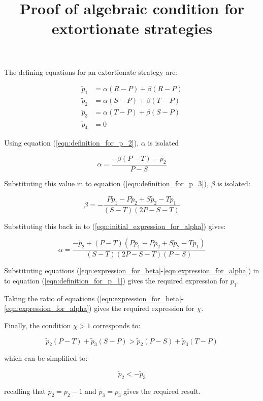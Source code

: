 \documentclass[a4]{article}
\title{Proof of algebraic condition for extortionate strategies}
\author{}
\date{}
\begin{document}
\maketitle

The defining equations for an extortionate strategy are:


\begin{align}
    \tilde p_1 & = \alpha (R - P) + \beta (R - P)\label{eqn:definition_for_p_1}\\
    \tilde p_2 & = \alpha (S - P) + \beta (T - P)\label{eqn:definition_for_p_2}\\
    \tilde p_3 & = \alpha (T - P) + \beta (S - P)\label{eqn:definition_for_p_3}\\
    \tilde p_4 & = 0
\end{align}

Using equation (\ref{eqn:definition_for_p_2}), \(\alpha\) is isolated

\begin{equation}\label{eqn:initial_expression_for_alpha}
    \alpha = \frac{-\beta (P - T) - \tilde p_2}
                  {P - S}
\end{equation}

Substituting this value in to equation (\ref{eqn:definition_for_p_3}), \(\beta\)
is isolated:

\begin{equation}\label{eqn:expression_for_beta}
    \beta = -\frac{P\tilde p_1 - P \tilde p_2 + S \tilde p_2 - T \tilde p_1}
                  {(S - T)(2 P - S - T)}
\end{equation}

Substituting this back in to (\ref{eqn:initial_expression_for_alpha}) gives:

\begin{equation}\label{eqn:expression_for_alpha}
    \alpha = \frac{-\tilde p_2 + (P - T)(P \tilde p_1 - P\tilde p_2 + S\tilde p_2 - T\tilde p_1)}
                  {(S - T)(2P - S - T)(P - S)}
\end{equation}

Substituting equations
(\ref{eqn:expression_for_beta}-\ref{eqn:expression_for_alpha}) in to
equation (\ref{eqn:definition_for_p_1}) gives the required expression for
\(p_1\).

Taking the ratio of equations
(\ref{eqn:expression_for_beta}-\ref{eqn:expression_for_alpha}) gives the
required expression for \(\chi\).

Finally, the condition \(\chi > 1\) corresponds to:


\begin{equation}
\tilde p_2 (P - T) + \tilde p_3 (S - P) >
                                      \tilde p_2 (P - S) + \tilde p_3 (T - P)
\end{equation}

which can be simplified to:

\begin{equation}
    \tilde p_2 < - \tilde p_3
\end{equation}

recalling that \(\tilde p_2 = p_2 - 1\) and \(\tilde p_3 = p_3\) gives the
required result.
\end{document}
